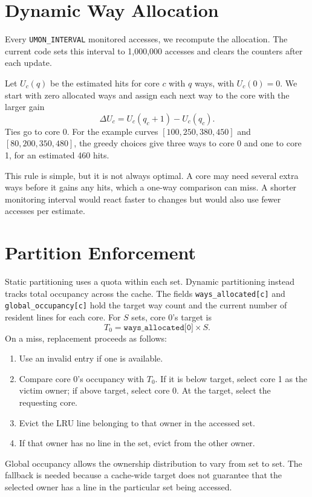 \documentclass{article}
\begin{document}
\section{Dynamic Way Allocation}
Every \texttt{UMON\_INTERVAL} monitored accesses, we recompute the allocation. The current code sets this interval to 1,000,000 accesses and clears the counters after each update.

Let $U_c(q)$ be the estimated hits for core $c$ with $q$ ways, with $U_c(0)=0$. We start with zero allocated ways and assign each next way to the core with the larger gain
\[
\Delta U_c=U_c(q_c+1)-U_c(q_c).
\]
Ties go to core 0. For the example curves $[100,250,380,450]$ and $[80,200,350,480]$, the greedy choices give three ways to core 0 and one to core 1, for an estimated 460 hits.

This rule is simple, but it is not always optimal. A core may need several extra ways before it gains any hits, which a one-way comparison can miss. A shorter monitoring interval would react faster to changes but would also use fewer accesses per estimate.

\section{Partition Enforcement}
Static partitioning uses a quota within each set. Dynamic partitioning instead tracks total occupancy across the cache. The fields \texttt{ways\_allocated[c]} and \texttt{global\_occupancy[c]} hold the target way count and the current number of resident lines for each core. For $S$ sets, core 0's target is
\[
T_0=\texttt{ways\_allocated[0]}\times S.
\]
On a miss, replacement proceeds as follows:
\begin{enumerate}
\item Use an invalid entry if one is available.
\item Compare core 0's occupancy with $T_0$. If it is below target, select core 1 as the victim owner; if above target, select core 0. At the target, select the requesting core.
\item Evict the LRU line belonging to that owner in the accessed set.
\item If that owner has no line in the set, evict from the other owner.
\end{enumerate}
Global occupancy allows the ownership distribution to vary from set to set. The fallback is needed because a cache-wide target does not guarantee that the selected owner has a line in the particular set being accessed.
\end{document}
